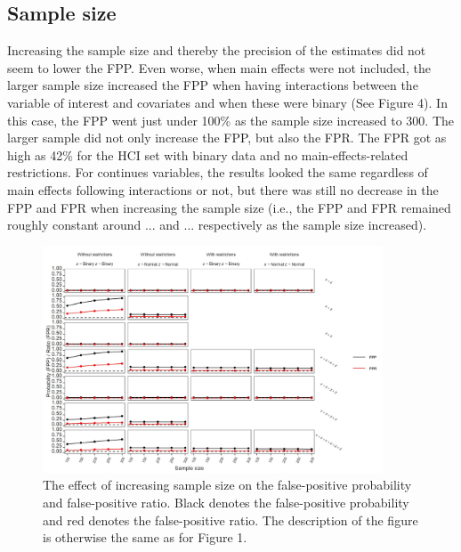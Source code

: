 \subsection{Sample size}
Increasing the sample size and thereby the precision of the estimates did not seem to lower the FPP. Even worse, when main effects were not included, the larger sample size increased the FPP when having interactions between the variable of interest and covariates and when these were binary (See Figure 4). In this case, the FPP went just under 100\% as the sample size increased to 300. The larger sample did not only increase the FPP, but also the FPR. The FPR got as high as 42\% for the HCI set with binary data and no main-effects-related restrictions. For continues variables, the results looked the same regardless of main effects following interactions or not, but there was still no decrease in the FPP and FPR when increasing the sample size (i.e., the FPP and FPR remained roughly constant around ... and ... respectively as the sample size increased). 


\begin{figure}[hbt!]
\includegraphics[width=0.9\textwidth]{R/Analysis/Result/Figures/Figure1D.jpeg}
\centering
\caption{The effect of increasing sample size on the false-positive probability and false-positive ratio. Black denotes the false-positive probability and red denotes the false-positive ratio. The description of the figure is otherwise the same as for Figure 1.}
\label{fig:mainfigure}
\end{figure}

